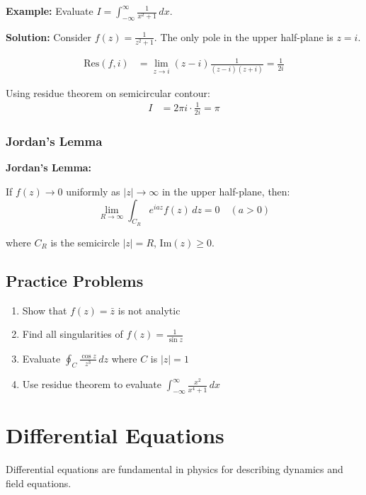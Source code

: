 \documentclass[12pt,a4paper]{article}
\begin{document}
\begin{examplebox}
\textbf{Example:} Evaluate $I = \int_{-\infty}^{\infty} \frac{1}{x^2 + 1} \, dx$.

\textbf{Solution:} Consider $f(z) = \frac{1}{z^2 + 1}$. The only pole in the upper half-plane is $z = i$.

\begin{align}
\text{Res}(f, i) &= \lim_{z \to i} (z - i) \frac{1}{(z-i)(z+i)} = \frac{1}{2i}
\end{align}

Using residue theorem on semicircular contour:
\begin{align}
I &= 2\pi i \cdot \frac{1}{2i} = \pi
\end{align}
\end{examplebox}

\subsubsection{Jordan's Lemma}
\begin{importantbox}
\textbf{Jordan's Lemma:}

If $f(z) \to 0$ uniformly as $|z| \to \infty$ in the upper half-plane, then:
\begin{equation}
\lim_{R \to \infty} \int_{C_R} e^{iaz} f(z) \, dz = 0 \quad (a > 0)
\end{equation}

where $C_R$ is the semicircle $|z| = R$, $\text{Im}(z) \geq 0$.
\end{importantbox}

\subsection{Practice Problems}
\begin{enumerate}
    \item Show that $f(z) = \bar{z}$ is not analytic
    \item Find all singularities of $f(z) = \frac{1}{\sin z}$
    \item Evaluate $\oint_C \frac{\cos z}{z^3} \, dz$ where $C$ is $|z| = 1$
    \item Use residue theorem to evaluate $\int_{-\infty}^{\infty} \frac{x^2}{x^4 + 1} \, dx$
\end{enumerate}

\newpage

\section{Differential Equations}
Differential equations are fundamental in physics for describing dynamics and field equations.
\end{document}
